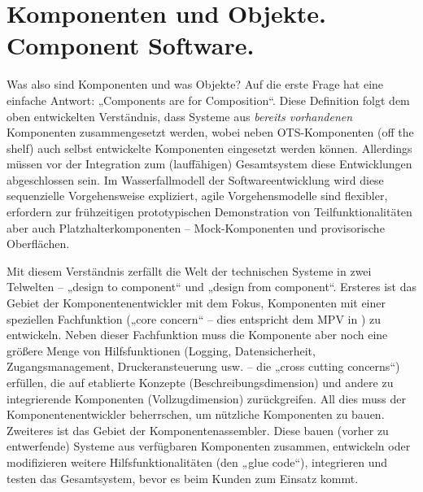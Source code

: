 \documentclass[11pt,a4paper]{article}
\begin{document}
\section{Komponenten und Objekte. Component Software.}

Was also sind Komponenten und was Objekte? Auf die erste Frage hat
\cite{Szyperski2002} eine einfache Antwort: „Components are for Composition“.
Diese Definition folgt dem oben entwickelten Verständnis, dass Systeme aus
\emph{bereits vorhandenen} Komponenten zusammengesetzt werden, wobei neben
OTS-Komponenten (off the shelf) auch selbst entwickelte Komponenten eingesetzt
werden können. Allerdings müssen vor der Integration zum (lauffähigen)
Gesamtsystem diese Entwicklungen abgeschlossen sein. Im Wasserfallmodell der
Softwareentwicklung wird diese sequenzielle Vorgehensweise expliziert, agile
Vorgehensmodelle sind flexibler, erfordern zur frühzeitigen prototypischen
Demonstration von Teilfunktionalitäten aber auch Platzhalterkomponenten --
Mock-Komponenten und provisorische Oberflächen.

Mit diesem Verständnis zerfällt die Welt der technischen Systeme in zwei
Telwelten -- „design to component“ und „design from component“. Ersteres ist
das Gebiet der Komponentenentwickler mit dem Fokus, Komponenten mit einer
speziellen Fachfunktion („core concern“ -- dies entspricht dem MPV in
\cite{TESE2018}) zu entwickeln. Neben dieser Fachfunktion muss die Komponente
aber noch eine größere Menge von Hilfsfunktionen (Logging, Datensicherheit,
Zugangsmanagement, Druckeransteuerung usw. -- die „cross cutting concerns“)
erfüllen, die auf etablierte Konzepte (Beschreibungsdimension) und andere zu
integrierende Komponenten (Vollzugdimension) zurückgreifen.  All dies muss der
Komponentenentwickler beherrschen, um nützliche Komponenten zu bauen.
Zweiteres ist das Gebiet der Komponentenassembler. Diese bauen (vorher zu
entwerfende) Systeme aus verfügbaren Komponenten zusammen, entwickeln oder
modifizieren weitere Hilfsfunktionalitäten (den „glue code“), integrieren und
testen das Gesamtsystem, bevor es beim Kunden zum Einsatz kommt.
\end{document}
